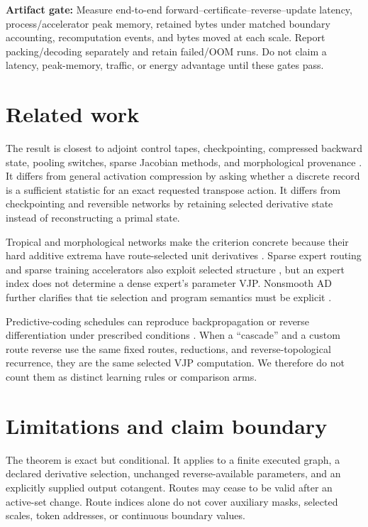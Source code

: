 \documentclass[10pt]{article}
\newcommand{\todo}[1]{\par\noindent\colorbox{Yellow!25}{\parbox{0.96\linewidth}{\textbf{Artifact gate:} #1}}\par}
\begin{document}
\todo{Measure end-to-end forward--certificate--reverse--update latency,
process/accelerator peak memory, retained bytes under matched boundary
accounting, recomputation events, and bytes moved at each scale.  Report
packing/decoding separately and retain failed/OOM runs.  Do not claim a latency,
peak-memory, traffic, or energy advantage until these gates pass.}



\section{Related work}

The result is closest to adjoint control tapes, checkpointing, compressed
backward state, pooling switches, sparse Jacobian methods, and morphological
provenance \citep{giering1998recipes,griewank2000revolve,coleman1998sparse,zeiler2014visualizing,jain2018gist,novikov2023fewbit,groenendijk2023geometric}.
It differs from general activation compression by asking whether a discrete
record is a sufficient statistic for an exact requested transpose action.
It differs from checkpointing and reversible networks by retaining selected
derivative state instead of reconstructing a primal state.

Tropical and morphological networks make the criterion concrete because their
hard additive extrema have route-selected unit derivatives
\citep{zhang2018tropical,franchi2020morphological}.  Sparse expert routing and
sparse training accelerators also exploit selected structure
\citep{shazeer2017moe,parashar2017scnn,yang2020procrustes}, but an expert index
does not determine a dense expert's parameter VJP.  Nonsmooth AD further
clarifies that tie selection and program semantics must be explicit
\citep{bolte2023nonsmooth}.

Predictive-coding schedules can reproduce backpropagation or reverse
differentiation under prescribed conditions
\citep{song2020exactpc,salvatori2022reverse,millidge2022arbitrary}.  When a
``cascade'' and a custom route reverse use the same fixed routes, reductions,
and reverse-topological recurrence, they are the same selected VJP computation.
We therefore do not count them as distinct learning rules or comparison arms.

\section{Limitations and claim boundary}

The theorem is exact but conditional.  It applies to a finite executed graph,
a declared derivative selection, unchanged reverse-available parameters, and
an explicitly supplied output cotangent.  Routes may cease to be valid after
an active-set change.  Route indices alone do not cover auxiliary masks,
selected scales, token addresses, or continuous boundary values.
\end{document}
